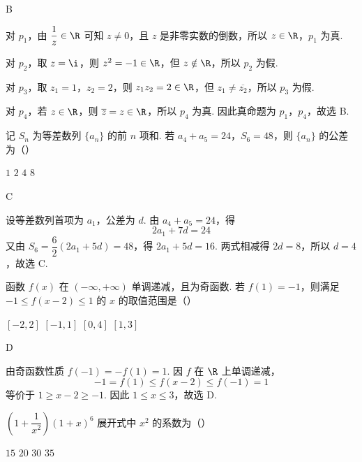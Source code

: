 \begin{answer}
B
\end{answer}

\begin{solution}
对 \(p_1\)，由 \(\dfrac1z\in\R\) 可知 \(z\ne0\)，且 \(z\) 是非零实数的倒数，所以 \(z\in\R\)，\(p_1\) 为真.

对 \(p_2\)，取 \(z=\i\)，则 \(z^2=-1\in\R\)，但 \(z\notin\R\)，所以 \(p_2\) 为假.

对 \(p_3\)，取 \(z_1=1\)，\(z_2=2\)，则 \(z_1z_2=2\in\R\)，但 \(z_1\ne\overline{z_2}\)，所以 \(p_3\) 为假.

对 \(p_4\)，若 \(z\in\R\)，则 \(\overline z=z\in\R\)，所以 \(p_4\) 为真. 因此真命题为 \(p_1\)，\(p_4\)，故选 B.
\end{solution}

\begin{problem}
记 \(S_n\) 为等差数列 \(\{a_n\}\) 的前 \(n\) 项和. 若 \(a_4+a_5=24\)，\(S_6=48\)，则 \(\{a_n\}\) 的公差为（\quad）

\choices
    {\(1\)}
    {\(2\)}
    {\(4\)}
    {\(8\)}
\end{problem}

\begin{answer}
C
\end{answer}

\begin{solution}
设等差数列首项为 \(a_1\)，公差为 \(d\). 由 \(a_4+a_5=24\)，得
\[
2a_1+7d=24
\]
又由 \(S_6=\dfrac{6}{2}(2a_1+5d)=48\)，得 \(2a_1+5d=16\). 两式相减得 \(2d=8\)，所以 \(d=4\)，故选 C.
\end{solution}

\begin{problem}
函数 \(f(x)\) 在 \((-\infty,+\infty)\) 单调递减，且为奇函数. 若 \(f(1)=-1\)，则满足 \(-1\le f(x-2)\le1\) 的 \(x\) 的取值范围是（\quad）

\choices
    {\([-2,2]\)}
    {\([-1,1]\)}
    {\([0,4]\)}
    {\([1,3]\)}
\end{problem}

\begin{answer}
D
\end{answer}

\begin{solution}
由奇函数性质 \(f(-1)=-f(1)=1\). 因 \(f\) 在 \(\R\) 上单调递减，
\[
-1=f(1)\le f(x-2)\le f(-1)=1
\]
等价于 \(1\ge x-2\ge-1\). 因此 \(1\le x\le3\)，故选 D.
\end{solution}

\begin{problem}
\(\left(1+\dfrac1{x^2}\right)(1+x)^6\) 展开式中 \(x^2\) 的系数为（\quad）

\choices
    {\(15\)}
    {\(20\)}
    {\(30\)}
    {\(35\)}
\end{problem}


